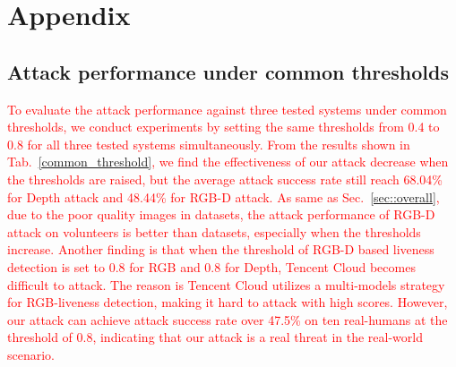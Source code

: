 \clearpage
\appendix


\section{Appendix}

\subsection{Attack performance under common thresholds}
\label{sec:common_thresholds}
\textcolor{red}{
To evaluate the attack performance against three tested systems under common thresholds, we conduct experiments by setting the same thresholds from 0.4 to 0.8 for all three tested systems simultaneously.
From the results shown in Tab.~\ref{common_threshold}, we find the effectiveness of our attack decrease when the thresholds are raised, but the average attack success rate still reach 68.04\% for Depth attack and 48.44\% for RGB-D attack.
As same as Sec.~\ref{sec::overall}, due to the poor quality images in datasets, the attack performance of RGB-D attack on volunteers is better than datasets, especially when the thresholds increase.
Another finding is that when the threshold of RGB-D based liveness detection is set to 0.8 for RGB and 0.8 for Depth, Tencent Cloud becomes difficult to attack. The reason is Tencent Cloud utilizes a multi-models strategy for RGB-liveness detection, making it hard to attack with high scores.
However, our attack can achieve attack success rate over 47.5\% on ten real-humans at the threshold of 0.8, indicating that our attack is a real threat in the real-world scenario.
}

